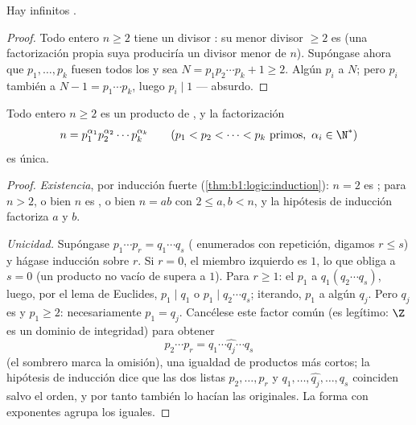 \begin{theorem}[Euclides]\label{thm:b1:arith:euclidprimes}
Hay infinitos .
\end{theorem}

\begin{proof}
Todo entero $n \geq 2$ tiene un divisor : su menor divisor
$\geq 2$ es  (una factorización propia suya produciría un divisor
menor de $n$). Supóngase ahora que $p_1, \dots, p_k$ fuesen todos los
 y sea $N = p_1 p_2 \cdots p_k + 1 \geq 2$. Algún  $p_i$
 a $N$; pero $p_i$  también a $N - 1 = p_1\cdots p_k$,
luego $p_i \mid 1$ --- absurdo.
\end{proof}

\begin{theorem}\label{thm:b1:arith:fta}
Todo entero $n \geq 2$ es un producto de , y la factorización
\[
n = p_1^{\alpha_1} p_2^{\alpha_2} \cdots p_k^{\alpha_k}
\qquad (p_1 < p_2 < \dots < p_k \text{ primos},\ \alpha_i \in \N^*)
\]
es única.
\end{theorem}

\begin{proof}
\emph{Existencia}, por inducción fuerte
(\cref{thm:b1:logic:induction}): $n = 2$ es ; para $n > 2$, o
bien $n$ es , o bien $n = ab$ con $2 \leq a, b < n$, y la
hipótesis de inducción factoriza $a$ y $b$.

\emph{Unicidad.} Supóngase $p_1 \cdots p_r = q_1 \cdots q_s$
( enumerados con repetición, digamos $r \leq s$) y hágase
inducción sobre $r$. Si $r = 0$, el miembro izquierdo es $1$, lo que
obliga a $s = 0$ (un producto no vacío de  supera a $1$). Para
$r \geq 1$: el  $p_1$  a $q_1(q_2\cdots q_s)$, luego, por
el lema de Euclides, $p_1 \mid q_1$ o $p_1 \mid q_2\cdots q_s$;
iterando, $p_1$  a algún $q_j$. Pero $q_j$ es  y
$p_1 \geq 2$: necesariamente $p_1 = q_j$. Cancélese este factor común
(es legítimo: $\Z$ es un dominio de integridad) para obtener
\[
p_2 \cdots p_r = q_1 \cdots \widehat{q_j} \cdots q_s
\]
(el sombrero marca la omisión), una igualdad de productos más cortos;
la hipótesis de inducción dice que las dos listas $p_2, \dots, p_r$ y
$q_1, \dots, \widehat{q_j}, \dots, q_s$ coinciden salvo el orden, y
por tanto también lo hacían las originales. La forma con exponentes
agrupa los  iguales.
\end{proof}

